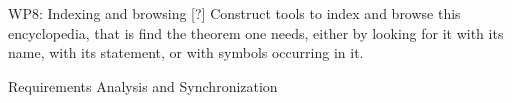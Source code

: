 \begin{workpackage}[id=structuring,wphases=0-48,
  short=Structured theories,%
  title=Structured theories,
  lead=FAU,
  FAURM=18]
\begin{wpdescription}
WP8: Indexing and browsing [?]  Construct tools to index and browse
this encyclopedia, that is find the theorem one needs, either by
looking for it with its name, with its statement, or with symbols
occurring in it.
\end{wpdescription}

\begin{tasklist}
\begin{task}[id=modules,title=Module Systems]
\end{task}
\end{tasklist}

\begin{wpdelivs}
  \begin{wpdeliv}[due=3,miles=startup,id=requirements,dissem=PU,nature=DEM,lead=ISa]
      {Requirements Analysis and Synchronization}
\end{wpdeliv}
\end{wpdelivs}
\end{workpackage}


